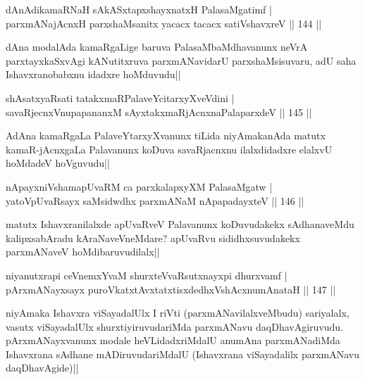 \begin{shl}
dAnAdikamaRNaH sAkASxtapxshayxnatxH PalasaMgatimf |\\
parxmANajAcnxH parxshaMsanitx yacacx tacacx satiVshavxreV \hfill || 144 ||
\end{shl}

\begin{artha}
dAna modalAda kamaRgaLige baruva PalasaMbaMdhavanunx neVrA parxtayxkaSxvAgi kANutitxruva parxmANavidarU parxshaMsisuvaru, adU saha Ishavxranobabxnu idadxre hoMduvudu||
\end{artha}

\begin{shl}
shAsatxyaRsati tatakxmaRPalaveYcitarxyXveVdini |\\
savaRjecnxV\s nupapananxM sAyxtakxmaRjAcnxnaPalaparxdeV \hfill || 145 ||
\end{shl}

\begin{artha}
AdAna kamaRgaLa PalaveYtarxyXvanunx tiLida niyAmakanAda matutx kamaR-jAcnxgaLa Palavanunx koDuva savaRjacnxnu ilalxdidadxre elalxvU hoMdadeV hoVguvudu||
\end{artha}


\begin{shl}
nApayxniVshamapUvaRM ca parxkalapxyXM PalasaMgatw |\\
yatoV\s pUvaRsayx saMsidwdhx parxmANaM nApapadayxteV \hfill || 146 ||
\end{shl}

\begin{artha}
matutx Ishavxranilalxde apUvaRveV Palavanunx koDuvudakekx sAdhanaveMdu kalipxsabAradu kAraNaveVneMdare? apUvaRvu sididhxsuvudakekx parxmANaveV hoMdibaruvudilalx||
\end{artha}

\begin{shl}
niyanutxrapi ceVnemxYvaM shurxteVvaRsutxnayxpi dhurxvamf |\\
pArxmANayxsayx puroVkatxtAvxtatxtisxdedhxVshAcxnumAnataH \hfill || 147 ||
\end{shl}

\begin{artha}%
niyAmaka Ishavxra viSayadalUlx I riVti (parxmANavilalxveMbudu) sariyalalx, vasutx viSayadalUlx shurxtiyiruvudariMda parxmANavu daqDhavAgiruvudu. pArxmANayxvanunx modale heVLidadxriMdalU anumAna parxmANadiMda Ishavxrana sAdhane mADiruvudariMdalU (Ishavxrana viSayadalilx parxmANavu daqDhavAgide)||
\end{artha}

